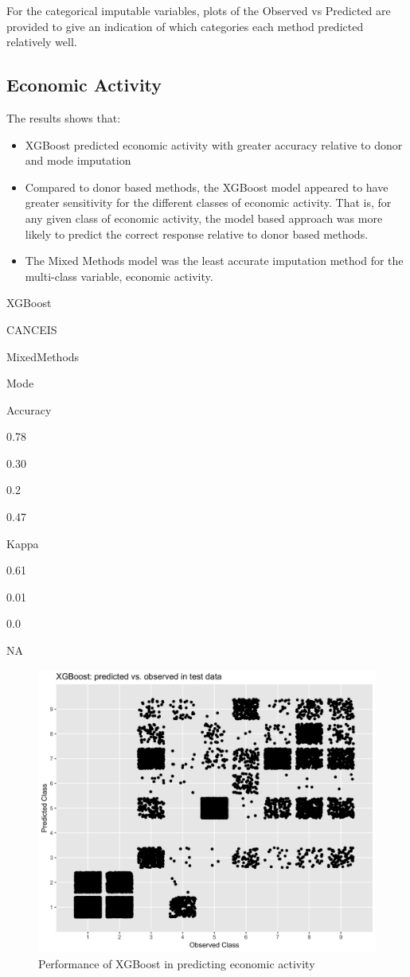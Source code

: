 \documentclass[]{book}
\providecommand{\tightlist}{%
  \setlength{\itemsep}{0pt}\setlength{\parskip}{0pt}}
\begin{document}
For the categorical imputable variables, plots of the Observed vs
Predicted are provided to give an indication of which categories each
method predicted relatively well.

\subsection{Economic Activity}\label{economic-activity}

The results shows that:

\begin{itemize}
\tightlist
\item
  XGBoost predicted economic activity with greater accuracy relative to
  donor and mode imputation\\
\item
  Compared to donor based methods, the XGBoost model appeared to have
  greater sensitivity for the different classes of economic activity.
  That is, for any given class of economic activity, the model based
  approach was more likely to predict the correct response relative to
  donor based methods.
\item
  The Mixed Methods model was the least accurate imputation method for
  the multi-class variable, economic activity.
\end{itemize}

XGBoost

CANCEIS

MixedMethods

Mode

Accuracy

0.78

0.30

0.2

0.47

Kappa

0.61

0.01

0.0

NA

\begin{figure}
\centering
\includegraphics{images/EAXGBoostqplot.png}
\caption{Performance of XGBoost in predicting economic activity}
\end{figure}
\end{document}

